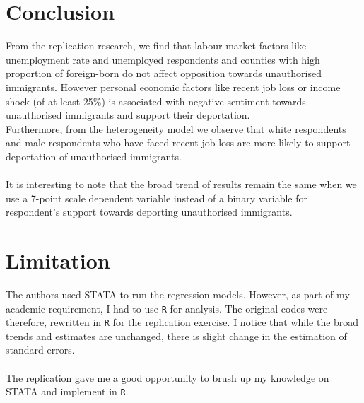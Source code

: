 \documentclass[12pt,letterpaper]{article}
\begin{document}
\section*{Conclusion}
From the replication research, we find that labour market factors like unemployment rate and unemployed respondents and counties with high proportion of foreign-born do not affect opposition towards unauthorised immigrants. However personal economic factors like recent job loss or income shock (of at least 25\%) is associated with negative sentiment towards unauthorised immigrants and support their deportation.\\
Furthermore, from the heterogeneity model we observe that white respondents and male respondents who have faced recent job loss are more likely to support deportation of unauthorised immigrants.\\
\\It is interesting to note that the broad trend of results remain the same when we use a 7-point scale dependent variable instead of a binary variable for respondent's support towards deporting unauthorised immigrants.

\vspace*{.2cm}

\section*{Limitation}
The authors used STATA to run the regression models. However, as part of my academic requirement, I had to use \texttt{R} for analysis. The original codes were therefore, rewritten in \texttt{R} for the replication exercise. I notice that while the broad trends and estimates are unchanged, there is slight change in the estimation of standard errors.\\
\\The replication gave me a good opportunity to brush up my knowledge on STATA and implement in \texttt{R}.
\end{document}

